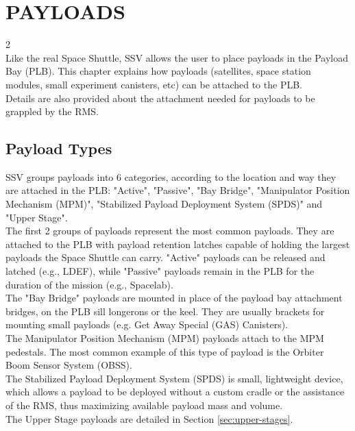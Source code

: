 \documentclass[Space_Shuttle_Vessel_Manual.tex]{subfiles}
\begin{document}
\section{PAYLOADS}
\begin{multicols*}{2}
\label{sec:payloads}
\renewcommand{\cfttoctitlefont}{\bf}
\localtableofcontents
\noindent
\\
Like the real Space Shuttle, SSV allows the user to place payloads in the Payload Bay (PLB). This chapter explains how payloads (satellites, space station modules, small experiment canisters, etc) can be attached to the PLB.\\
Details are also provided about the attachment needed for payloads to be grappled by the RMS.
\newpage


\subsection{Payload Types}
\noindent
SSV groups payloads into 6 categories, according to the location and way they are attached in the PLB: "Active", "Passive", "Bay Bridge", "Manipulator Position Mechanism (MPM)", "Stabilized Payload Deployment System (SPDS)" and "Upper Stage".\\
The first 2 groups of payloads represent the most common payloads. They are attached to the PLB with payload retention latches capable of holding the largest payloads the Space Shuttle can carry. "Active" payloads can be released and latched (e.g., LDEF), while "Passive" payloads remain in the PLB for the duration of the mission (e.g., Spacelab).\\
The "Bay Bridge" payloads are mounted in place of the payload bay attachment bridges, on the PLB sill longerons or the keel. They are usually brackets for mounting small payloads (e.g. Get Away Special (GAS) Canisters).\\
The Manipulator Position Mechanism (MPM) payloads attach to the MPM pedestals. The most common example of this type of payload is the Orbiter Boom Sensor System (OBSS).\\
The Stabilized Payload Deployment System (SPDS) is small, lightweight device, which allows a payload to be deployed without a custom cradle or the assistance of the RMS, thus maximizing available payload mass and volume.\\
The Upper Stage payloads are detailed in Section \ref{sec:upper-stages}.



\end{multicols*}
\end{document}
